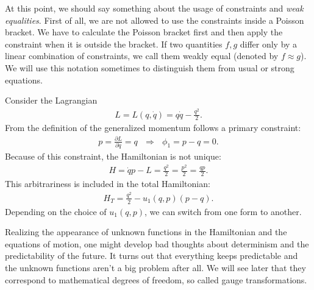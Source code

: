 At this point, we should say something about the usage of constraints and \textit{weak equalities}. First of all, we are not allowed to use the constraints inside a Poisson bracket. We have to calculate the Poisson bracket first and then apply the constraint when it is outside the bracket. If two quantities $f,g$ differ only by a linear combination of constraints, we call them weakly equal (denoted by $f \approx g$). We will use this notation sometimes to distinguish them from usual or strong equations.

\begin{example}
Consider the Lagrangian
\begin{align}
L = L(q,\dot{q}) = q \dot{q} - \frac{q^2}{2}.
\end{align}
From the definition of the generalized momentum follows a primary constraint:
\begin{align}
p = \frac{\partial L}{\partial \dot{q}} = q \ \ \ \Longrightarrow \ \ \ \phi_1 = p - q = 0.
\end{align}
Because of this constraint, the Hamiltonian is not unique:
\begin{align}
H = \dot{q} p - L = \frac{q^2}{2} = \frac{p^2}{2} = \frac{q p}{2}.
\end{align}
This arbitrariness is included in the total Hamiltonian:
\begin{align}
H_T = \frac{q^2}{2} - u_1(q,p) (p-q).
\end{align}
Depending on the choice of $u_1(q,p)$, we can switch from one form to another.
\end{example}

Realizing the appearance of unknown functions in the Hamiltonian and the equations of motion, one might develop bad thoughts about determinism and the predictability of the future.
It turns out that everything keeps predictable and the unknown functions aren't a big problem after all. We will see later that they correspond to mathematical degrees of freedom, so called gauge transformations. \\

